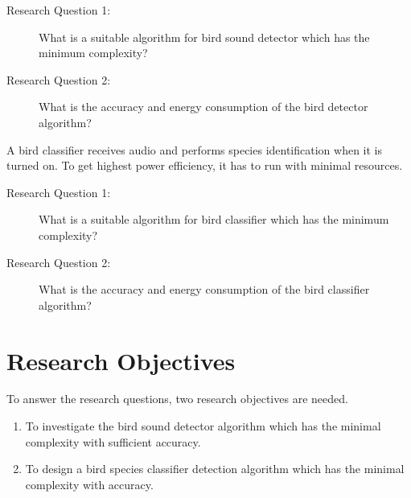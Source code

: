 \begin{description}
    \item [Research Question 1:] What is a suitable algorithm for bird sound detector which has the minimum complexity?
    \item [Research Question 2:] What is the accuracy and energy consumption of the bird detector algorithm?
\end{description}

A bird classifier receives audio and performs species identification when it is turned on. To get highest power efficiency, it has to run with minimal resources.

\begin{description}
    \item [Research Question 1:] What is a suitable algorithm for bird classifier which has the minimum complexity?
    \item [Research Question 2:] What is the accuracy and energy consumption of the bird classifier algorithm?
\end{description}

\section{Research Objectives}

To answer the research questions, two research objectives are needed.

\begin{enumerate}
    \item To investigate the bird sound detector algorithm which has the minimal complexity with sufficient accuracy.
    \item To design a bird species classifier detection algorithm which has the minimal complexity with  accuracy.
\end{enumerate}